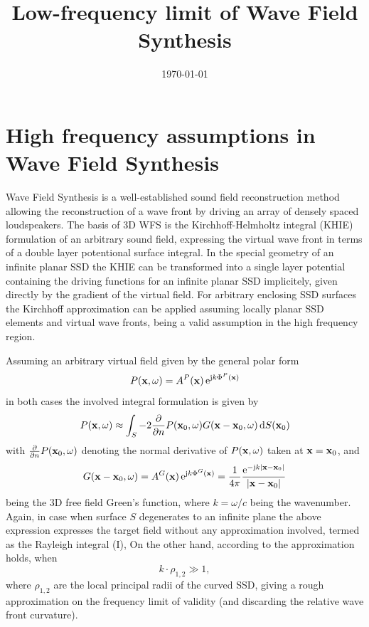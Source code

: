\documentclass[11pt]{article}
\begin{document}
\title{Low-frequency limit of Wave Field Synthesis}
\date{\today}  %
\maketitle

\section{High frequency assumptions in Wave Field Synthesis}

Wave Field Synthesis is a well-established sound field reconstruction method allowing the reconstruction of a wave front by driving an array of densely spaced loudspeakers.
The basis of 3D WFS is the Kirchhoff-Helmholtz integral (KHIE) formulation of an arbitrary sound field, expressing the virtual wave front in terms of a double layer potentional surface integral.
In the special geometry of an infinite planar SSD the KHIE can be transformed into a single layer potential containing the driving functions for an infinite planar SSD implicitely, given directly by the gradient of the virtual field.
For arbitrary enclosing SSD surfaces the Kirchhoff approximation can be applied assuming locally planar SSD elements and virtual wave fronts, being a valid assumption in the high frequency region.

Assuming an arbitrary virtual field given by the general polar form
\begin{equation}
    P(\mathbf{x},\omega)  = A^P(\mathbf{x}) \, \mathrm{e}^{ \mathrm{j} k \Phi^P(\mathbf{x})}
\end{equation}
in both cases the involved integral formulation is given by
\begin{equation}
    P(\mathbf{x},\omega) \approx \int_S -2 \frac{\partial }{\partial n} P(\mathbf{x}_0,\omega) G(\mathbf{x}-\mathbf{x}_0,\omega) \, \mathrm{d} S(\mathbf{x}_0) 
\end{equation}
with $\frac{\partial }{\partial n} P(\mathbf{x}_0,\omega)$ denoting the normal derivative of $P(\mathbf{x},\omega)$ taken at $\mathbf{x} = \mathbf{x}_0$, and 
\begin{equation}
    G(\mathbf{x}-\mathbf{x}_0,\omega) = A^G(\mathbf{x}) \, \mathrm{e}^{\mathrm{j} k \Phi^G(\mathbf{x})} = \frac{1}{4\pi} \frac{\mathrm{e}^{- \mathrm{j} k |\mathbf{x}-\mathbf{x}_0|}}{|\mathbf{x}-\mathbf{x}_0|}
\end{equation}
being the 3D free field Green's function, where $k = \omega/c$ being the wavenumber.
Again, in case when surface $S$ degenerates to an infinite plane the above expression expresses the target field without any approximation involved, termed as the Rayleigh integral (I),
On the other hand, according to \cite[Eq.(2.7.12)]{Blenstein1975} the approximation holds, when 
\begin{equation}
    k \cdot \rho_{1,2} \gg 1,
\end{equation}
where $\rho_{1,2}$ are the local principal radii of the curved SSD, giving a rough approximation on the frequency limit of validity (and discarding the relative wave front curvature).
\end{document}

